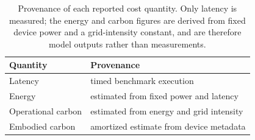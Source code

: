 \begin{table}[t]
\centering
\caption{Provenance of each reported cost quantity. Only latency is measured; the energy and carbon figures are derived from fixed device power and a grid-intensity constant, and are therefore model outputs rather than measurements.}
\label{tab:provenance}
\small
\begin{tabular}{ll}
\toprule
Quantity & Provenance \\
\midrule
Latency & timed benchmark execution \\
Energy & estimated from fixed power and latency \\
Operational carbon & estimated from energy and grid intensity \\
Embodied carbon & amortized estimate from device metadata \\
\bottomrule
\end{tabular}
\end{table}
